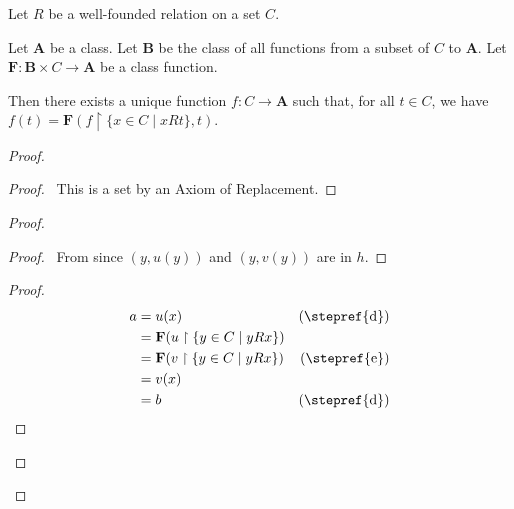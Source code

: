 \begin{theorem}
    Let $R$ be a well-founded relation on a set $C$.

    Let $\mathbf{A}$ be a class. Let $\mathbf{B}$ be the class of all functions
    from a subset of $C$ to $\mathbf{A}$.
    Let $\mathbf{F} : \mathbf{B} \times C \rightarrow \mathbf{A}$ be a class function.

    Then there
    exists a unique function $f : C \rightarrow \mathbf{A}$ such that, for all $t \in C$,
    we have $f(t) = \mathbf{F}(f \restriction \{ x \in C \mid x R t \}, t)$.
\end{theorem}

\begin{proof}
    \pf
    \begin{proof}
        \pf\ This is a set by an Axiom of Replacement.
    \end{proof}
    \begin{proof}
        \begin{proof}
            \pf\ From  since $(y,u(y))$ and $(y,v(y))$ are in $h$.
        \end{proof}
        \begin{proof}
            \pf
            \begin{align*}
                a & = u(x) & (\text{\stepref{d}}) \\
                & = \mathbf{F}(u \restriction \{ y \in C \mid y R x \}) \\
                & = \mathbf{F}(v \restriction \{ y \in C \mid y R x \}) & (\text{\stepref{e}}) \\
                & = v(x) \\
                & = b & (\text{\stepref{d}})

\end{align*}
\end{proof}
\end{proof}
\end{proof}
